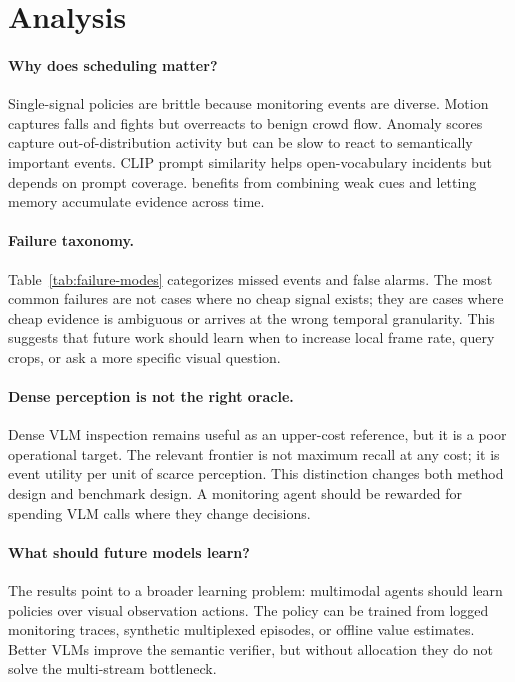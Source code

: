 \section{Analysis}

\paragraph{Why does scheduling matter?}
Single-signal policies are brittle because monitoring events are diverse. Motion captures falls and fights but overreacts to benign crowd flow. Anomaly scores capture out-of-distribution activity but can be slow to react to semantically important events. CLIP prompt similarity helps open-vocabulary incidents but depends on prompt coverage. \method{} benefits from combining weak cues and letting memory accumulate evidence across time.

\paragraph{Failure taxonomy.}
Table~\ref{tab:failure-modes} categorizes missed events and false alarms. The most common failures are not cases where no cheap signal exists; they are cases where cheap evidence is ambiguous or arrives at the wrong temporal granularity. This suggests that future work should learn when to increase local frame rate, query crops, or ask a more specific visual question.

\begin{table}[t]
\centering
\small
\caption{Failure modes for \method{} under the main budget. Shares are normalized over inspected failures.}
\label{tab:failure-modes}

\end{table}

\paragraph{Dense perception is not the right oracle.}
Dense VLM inspection remains useful as an upper-cost reference, but it is a poor operational target. The relevant frontier is not maximum recall at any cost; it is event utility per unit of scarce perception. This distinction changes both method design and benchmark design. A monitoring agent should be rewarded for spending VLM calls where they change decisions.

\paragraph{What should future models learn?}
The results point to a broader learning problem: multimodal agents should learn policies over visual observation actions. The policy can be trained from logged monitoring traces, synthetic multiplexed episodes, or offline value estimates. Better VLMs improve the semantic verifier, but without allocation they do not solve the multi-stream bottleneck.
